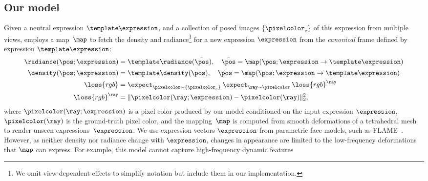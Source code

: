   \subsection{Our model}
    \label{sec:blendfields-model}
    Given a neutral expression $\template\expression$, and a collection of
    posed images $\{\pixelcolor_c\}$ of this expression from multiple views,
    \VolTeMorph employs a map~$\map$ to fetch the density and
    radiance\footnote{We omit view-dependent effects to simplify notation but
    include them in our implementation.
    } for a new expression $\expression$ from the \textit{canonical} frame defined by expression $\template\expression$:
    \begin{align}
      \radiance(\pos; \expression) & = \template\radiance(\bar\pos), \quad \bar\pos = \map(\pos; \expression \rightarrow \template\expression)
      \\
      \density(\pos; \expression)  & = \template\density(\bar\pos), \quad \bar\pos = \map(\pos; \expression \rightarrow \template\expression)
      \label{eq:blendfields-densityVoltemorph}
      \\
      \loss{rgb}                   & =
      \expect_{\pixelcolor \sim \{\pixelcolor_c\}} \:
      \expect_{\ray \sim \pixelcolor} \:
      \loss{rgb}^\ray
      \\
      \loss{rgb}^\ray              & = \| \pixelcolor(\ray; \expression) - \pixelcolor(\ray) \|_2^2,
    \end{align}
    where $\pixelcolor(\ray; \expression)$ is a pixel color produced by our model conditioned on the input expression $\expression$, $\pixelcolor(\ray)$ is the ground-truth pixel color, and the mapping~$\map$ is computed from smooth deformations of a tetrahedral mesh to render unseen expressions~$\expression$.
    We use expression vectors $\expression$ from parametric face models, such
    as FLAME~\cite{li2017flame,wood2021fake}.
    However, as neither density nor radiance change with $\expression$,
    changes in appearance are limited to the low-frequency deformations that
    $\map$ can express.
    For example, this model cannot capture high-frequency dynamic features
